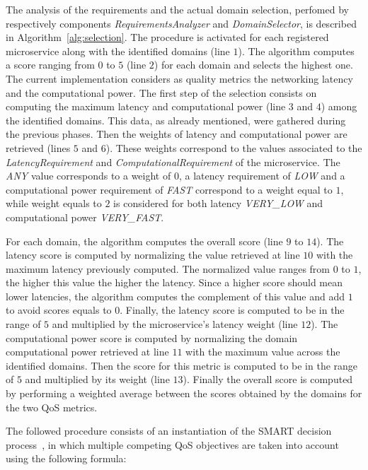 The analysis of the requirements and the actual domain selection, perfomed by respectively components  \textit{RequirementsAnalyzer} and \textit{DomainSelector}, is described in Algorithm~\ref{alg:selection}. The procedure is activated for each registered microservice along with the identified domains (line $1$). The algorithm computes a score ranging from $0$ to $5$ (line $2$) for each domain and selects the highest one. The current implementation considers as quality metrics the networking latency and the computational power. The first step of the selection consists on computing the maximum latency and computational power (line $3$ and $4$) among the identified domains. This data, as already mentioned, were gathered during the previous phases. Then the weights of latency and computational power are retrieved (lines $5$ and $6$). These weights correspond to the values associated to the \textit{LatencyRequirement} and \textit{ComputationalRequirement} of the microservice. The \textit{ANY} value corresponds to a weight of $0$, a latency requirement of \textit{LOW} and a computational power requirement of \textit{FAST} correspond to a weight equal to $1$, while weight equals to $2$ is considered for both latency \textit{VERY\_LOW} and computational power \textit{VERY\_FAST}.

For each domain, the algorithm computes the overall score (line  $9$ to $14$). The latency score is computed by normalizing the value retrieved at line $10$ with the maximum latency previously computed. The normalized value ranges from $0$ to $1$, the higher this value the higher the latency. Since a higher score should mean lower latencies, the algorithm computes the complement of this value and add $1$ to avoid scores equals to $0$. Finally, the latency score is computed to be in the range of $5$ and multiplied by the microservice's latency weight (line $12$). The computational power score is computed by normalizing the domain computational power retrieved at line $11$ with the  maximum value across the identified domains. Then the score for this metric is computed to be in the range of $5$ and multiplied by its weight (line $13$). Finally the overall score is computed by performing a weighted average between the scores obtained by the domains for the two QoS metrics.

The followed procedure consists of an instantiation of the SMART decision process~\cite{Olson1996}, in which multiple competing QoS objectives are taken into account using the following formula:

